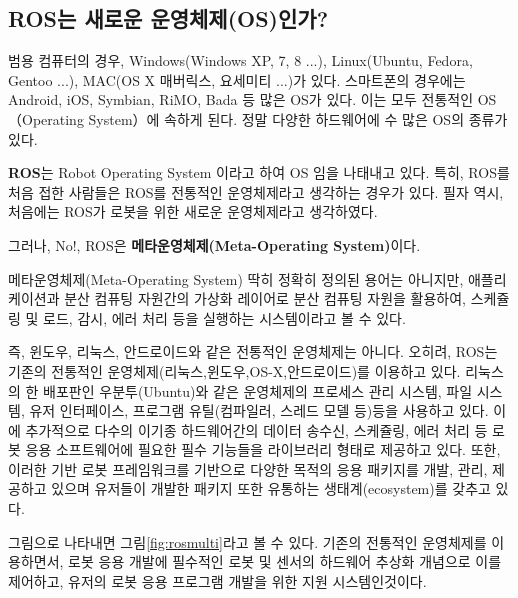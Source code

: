 \subsection{ROS는 새로운 운영체제(OS)인가?}

범용 컴퓨터의 경우, Windows(Windows XP, 7, 8 ...), Linux(Ubuntu, Fedora, Gentoo ...), MAC(OS X 매버릭스, 요세미티 ...)가 있다.
스마트폰의 경우에는 Android, iOS, Symbian, RiMO, Bada 등 많은 OS가 있다.
이는 모두 전통적인 OS（Operating System）에 속하게 된다.
정말 다양한 하드웨어에 수 많은 OS의 종류가 있다. 

\textbf{ROS}는 Robot Operating System 이라고 하여 OS 임을 나태내고 있다.
특히, ROS를 처음 접한 사람들은 ROS를 전통적인 운영체제라고 생각하는 경우가 있다.
필자 역시, 처음에는 ROS가 로봇을 위한 새로운 운영체제라고 생각하였다. 

\begin{center} 
그러나, No!, ROS은 \textbf{메타운영체제(Meta-Operating System)}이다.
\end{center}

메타운영체제(Meta-Operating System) 딱히 정확히 정의된 용어는 아니지만, 애플리케이션과 분산 컴퓨팅 자원간의 가상화 레이어로 분산 컴퓨팅 자원을 활용하여, 스케쥴링 및 로드, 감시, 에러 처리 등을 실행하는 시스템이라고 볼 수 있다.

즉, 윈도우, 리눅스, 안드로이드와 같은 전통적인 운영체제는 아니다.
오히려, ROS는 기존의 전통적인 운영체제(리눅스,윈도우,OS-X,안드로이드)를 이용하고 있다.
리눅스의 한 배포판인 우분투(Ubuntu)와 같은 운영체제의 프로세스 관리 시스템, 파일 시스템, 유저 인터페이스, 프로그램 유틸(컴파일러, 스레드 모델 등)등을 사용하고 있다.
이에 추가적으로 다수의 이기종 하드웨어간의 데이터 송수신, 스케쥴링, 에러 처리 등 로봇 응용 소프트웨어에 필요한 필수 기능들을 라이브러리 형태로 제공하고 있다.
또한, 이러한 기반 로봇 프레임워크를 기반으로 다양한 목적의 응용 패키지를 개발, 관리, 제공하고 있으며 유저들이 개발한 패키지 또한 유통하는 생태계(ecosystem)를 갖추고 있다.

그림으로 나타내면 그림\ref{fig:rosmulti}라고 볼 수 있다. 기존의 전통적인 운영체제를 이용하면서, 로봇 응용 개발에 필수적인 로봇 및 센서의 하드웨어 추상화 개념으로 이를 제어하고, 유저의 로봇 응용 프로그램 개발을 위한 지원 시스템인것이다.

